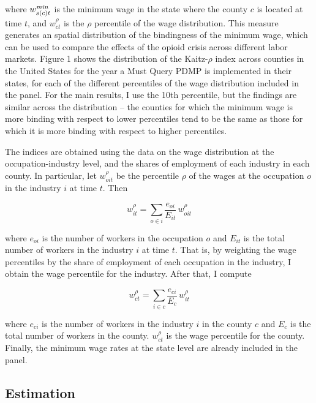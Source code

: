 \documentclass[12pt,a4paper]{article}
\begin{document}
where \(w^{\text{\textit{min}}}_{s(c)t}\) is the minimum wage in the state where the county \(c\) is located at time \(t\), and \(w^{\rho}_{ct}\) is the \(\rho\) percentile of the wage distribution.
This measure generates an spatial distribution of the bindingness of the minimum wage, which can be used to compare the effects of the opioid crisis across different labor markets.
Figure 1 shows the distribution of the Kaitz-\(\rho\) index across counties in the United States for the year a Must Query PDMP is implemented in their states, for each of the different percentiles of the wage distribution included in the panel.
For the main results, I use the 10th percentile, but the findings are similar across the distribution -- the counties for which the minimum wage is more binding with respect to lower percentiles tend to be the same as those for which it is more binding with respect to higher percentiles.

The indices are obtained using the data on the wage distribution at the occupation-industry level, and the shares of employment of each industry in each county. 
In particular, let \(w^{\rho}_{oit}\) be the percentile \(\rho\) of the wages at the occupation \(o\) in the industry \(i\) at time \(t\). 
Then

\begin{equation}
    w^{\rho}_{it} = \sum_{o\in i} \dfrac{e_{oi}}{E_{it}}\,w^{\rho}_{oit}
\end{equation}
    
where \(e_{oi}\) is the number of workers in the occupation \(o\) and \(E_{it}\) is the total number of workers in the industry \(i\) at time \(t\).
That is, by weighting the wage percentiles by the share of employment of each occupation in the industry, I obtain the wage percentile for the industry.
After that, I compute

\begin{equation}
    w^{\rho}_{ct} = \sum_{i\in c} \dfrac{e_{ci}}{E_c}\,w^{\rho}_{it}
\end{equation}

where \(e_{ci}\) is the number of workers in the industry \(i\) in the county \(c\) and \(E_c\) is the total number of workers in the county.
\(w^{\rho}_{ct}\) is the wage percentile for the county.
Finally, the minimum wage rates at the state level are already included in the panel.

\subsection*{Estimation}
\end{document}
